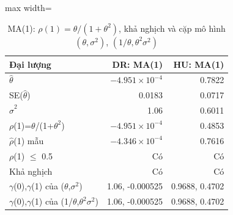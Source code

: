 \begin{table}[H]
\centering\footnotesize
\caption{MA(1): $\rho(1)=\theta/(1+\theta^2)$, khả nghịch và cặp mô hình $(\theta,\sigma^2)$, $(1/\theta,\theta^2\sigma^2)$}\label{tab:tab_b11_09_ma1}
\begin{adjustbox}{max width=\linewidth}
\begin{tabular}{|l|r|r|}
\toprule
Đại lượng & DR: MA(1) & HU: MA(1) \\
\midrule
$\hat{\theta}$ & $-4.951\times10^{-4}$ & 0.7822 \\
SE($\hat{\theta}$) & 0.0183 & 0.0717 \\
$\hat{\sigma}^{2}$ & 1.06 & 0.6011 \\
$\rho$(1)=$\theta$/(1+$\theta^{2}$) & $-4.951\times10^{-4}$ & 0.4853 \\
$\hat{\rho}$(1) mẫu & $-4.346\times10^{-4}$ & 0.7616 \\
\textbar{}$\rho$(1)\textbar{} $\le$ 0.5 & Có & Có \\
Khả nghịch & Có & Có \\
$\gamma$(0),$\gamma$(1) của ($\theta$,$\sigma^{2}$) & 1.06, -0.000525 & 0.9688, 0.4702 \\
$\gamma$(0),$\gamma$(1) của (1/$\theta$,$\theta^{2}\sigma^{2}$) & 1.06, -0.000525 & 0.9688, 0.4702 \\
\bottomrule
\end{tabular}
\end{adjustbox}
\end{table}
